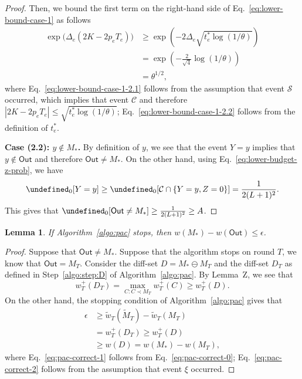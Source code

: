 \documentclass{article}
\newtheorem{lemma}{Lemma}
\newcommand{\diffvalid}{\prec}
\newcommand{\out}{\mathsf{Out}}
\let\Pr\undefined
\DeclareMathOperator{\Pr}{Pr}
\begin{document}
\begin{spacing}{1.1}
\begin{proof}
Then, we bound the first term on the right-hand side of Eq.~\eqref{eq:lower-bound-case-1} as follows
\begin{align}
	\exp\big(\Delta_e(2K-2p_eT_e)\big) & \ge \exp\left(-2\Delta_e\sqrt{t_e^*\log(1/\theta)}\right) \label{eq:lower-bound-case-1-2.1}\\
								       & = \exp\left(-\frac{2}{\sqrt{4}}\log(1/\theta)\right) \label{eq:lower-bound-case-1-2.2}\\
								       &=\theta^{1/2},  \label{eq:lower-bound-case-1-2.3}
\end{align}
where Eq.~\eqref{eq:lower-bound-case-1-2.1} follows from the assumption that event $\mathcal S$ occurred, which implies that event $\mathcal C$ and therefore $|2K-2p_eT_e| \le \sqrt{t_e^*\log(1/\theta)}$; 
Eq.~\eqref{eq:lower-bound-case-1-2.2} follows from the definition of $t_e^*$.

\textbf{Case (2.2): $y\not\in M_*$.}
By definition of $y$, we see that the event $Y=y$ implies that $y\not\in\out$ and therefore $\out\not=M_*$.
On the other hand, using Eq.~\eqref{eq:lower-budget-z-prob}, we have
$$\Pr_0[Y=y] \ge \Pr_0[\mathcal C \cap \{Y=y, Z=0\} ] = \frac{1}{2(L+1)^2}.$$
This gives that $\Pr_0[\out\not=M_*] \ge \frac{1}{2(L+1)^2} \ge A$.


\end{proof}


\begin{lemma}
\label{lemma:pac-correct}
If Algorithm~\ref{algo:pac} stops, then $w(M_*)-w(\out) \le \epsilon$.
\end{lemma}

\begin{proof}
Suppose that $\out \not= M_*$.
Suppose that the algorithm stops on round $T$, we know that $\out = M_T$.
Consider the diff-set $D=M_* \ominus M_T$ and the diff-set $D_T$ as defined in Step~\ref{algo:step:D} of Algorithm~\ref{algo:pac}.
By Lemma~Z, we see that 
\begin{equation}
w_T^+(D_T) = \max_{C: C \diffvalid M_T} w_T^+(C) \ge w_T^+(D).
\label{eq:pac-correct-0}
\end{equation}
On the other hand, the stopping condition of Algorithm~\ref{algo:pac} gives that
\begin{align}
\epsilon &\ge \tilde w_T(\tilde M_T)-\tilde w_T(M_T) \nonumber \\
		 &= w_T^+(D_T) \ge w_T^+(D) \label{eq:pac-correct-1} \\
		 &\ge w(D) = w(M_*)-w(M_T), \label{eq:pac-correct-2}
\end{align}
where Eq.~\eqref{eq:pac-correct-1} follows from Eq.~\eqref{eq:pac-correct-0}; Eq.~\eqref{eq:pac-correct-2} follows from the assumption that event $\xi$ occurred.


\end{proof}



\end{spacing}
\end{document}
